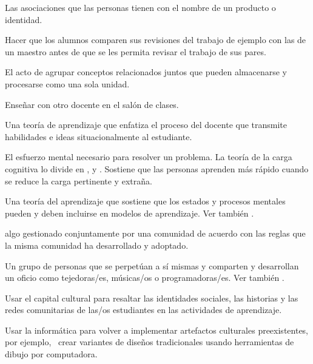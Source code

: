 \begin{description}
 Las asociaciones que las personas tienen con el nombre de un producto o
identidad.

 Hacer que los alumnos comparen sus 
revisiones del trabajo de ejemplo con las de un maestro antes de que 
se les permita revisar el trabajo de sus pares.

 El acto de agrupar conceptos relacionados juntos
que pueden almacenarse y procesarse como una sola unidad.

 Enseñar con otro docente en el
salón de clases.

 Una teoría de
aprendizaje que enfatiza el proceso del docente que transmite habilidades e ideas
situacionalmente al estudiante.

 El esfuerzo mental necesario para resolver un problema.
La teoría de la carga cognitiva lo divide en
 ,
y .
Sostiene que las personas aprenden más rápido cuando se reduce la carga pertinente y extraña.

 Una teoría del aprendizaje que sostiene que los estados 
y procesos mentales pueden y deben incluirse en modelos de aprendizaje. Ver también
.

 algo gestionado conjuntamente por una comunidad 
de acuerdo con las reglas que la misma comunidad ha desarrollado y adoptado.

 Un grupo de personas que se perpetúan a sí mismas 
y comparten y desarrollan un oficio como tejedoras/es, músicas/os o programadoras/es. Ver también
.

 Usar el capital cultural 
para resaltar las identidades sociales, las historias y las redes comunitarias de 
las/os estudiantes en las actividades de aprendizaje.

 Usar la informática 
para volver a implementar artefactos culturales preexistentes, por ejemplo, 
\ crear variantes de diseños tradicionales usando herramientas de dibujo por computadora.



\end{description}
